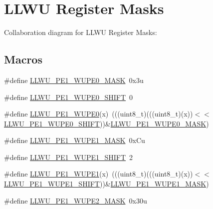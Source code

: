 \hypertarget{group___l_l_w_u___register___masks}{}\section{L\+L\+WU Register Masks}
\label{group___l_l_w_u___register___masks}
Collaboration diagram for L\+L\+WU Register Masks\+:
\subsection*{Macros}
\begin{DoxyCompactItemize}
\item 
\#define \hyperlink{group___l_l_w_u___register___masks_ga6ed6c56a8797caa64d27eb915c164dad}{L\+L\+W\+U\+\_\+\+P\+E1\+\_\+\+W\+U\+P\+E0\+\_\+\+M\+A\+SK}~0x3u
\item 
\#define \hyperlink{group___l_l_w_u___register___masks_ga234c02ee9c2b3e3e248c90473e922336}{L\+L\+W\+U\+\_\+\+P\+E1\+\_\+\+W\+U\+P\+E0\+\_\+\+S\+H\+I\+FT}~0
\item 
\#define \hyperlink{group___l_l_w_u___register___masks_ga61f1d3c27404e82bdebb9627e83f35dd}{L\+L\+W\+U\+\_\+\+P\+E1\+\_\+\+W\+U\+P\+E0}(x)~(((uint8\+\_\+t)(((uint8\+\_\+t)(x))$<$$<$\hyperlink{group___l_l_w_u___register___masks_ga234c02ee9c2b3e3e248c90473e922336}{L\+L\+W\+U\+\_\+\+P\+E1\+\_\+\+W\+U\+P\+E0\+\_\+\+S\+H\+I\+FT}))\&\hyperlink{group___l_l_w_u___register___masks_ga6ed6c56a8797caa64d27eb915c164dad}{L\+L\+W\+U\+\_\+\+P\+E1\+\_\+\+W\+U\+P\+E0\+\_\+\+M\+A\+SK})
\item 
\#define \hyperlink{group___l_l_w_u___register___masks_gac0c417f78992f2ebaca7267ef06d888a}{L\+L\+W\+U\+\_\+\+P\+E1\+\_\+\+W\+U\+P\+E1\+\_\+\+M\+A\+SK}~0x\+Cu
\item 
\#define \hyperlink{group___l_l_w_u___register___masks_gaa9b8224f389f9c3d4f13772d8e5fbeee}{L\+L\+W\+U\+\_\+\+P\+E1\+\_\+\+W\+U\+P\+E1\+\_\+\+S\+H\+I\+FT}~2
\item 
\#define \hyperlink{group___l_l_w_u___register___masks_gab35a751adac37592806af18a4f6e3837}{L\+L\+W\+U\+\_\+\+P\+E1\+\_\+\+W\+U\+P\+E1}(x)~(((uint8\+\_\+t)(((uint8\+\_\+t)(x))$<$$<$\hyperlink{group___l_l_w_u___register___masks_gaa9b8224f389f9c3d4f13772d8e5fbeee}{L\+L\+W\+U\+\_\+\+P\+E1\+\_\+\+W\+U\+P\+E1\+\_\+\+S\+H\+I\+FT}))\&\hyperlink{group___l_l_w_u___register___masks_gac0c417f78992f2ebaca7267ef06d888a}{L\+L\+W\+U\+\_\+\+P\+E1\+\_\+\+W\+U\+P\+E1\+\_\+\+M\+A\+SK})
\item 
\#define \hyperlink{group___l_l_w_u___register___masks_ga97e8e2fc8ce673f6b4625d307bc94b4a}{L\+L\+W\+U\+\_\+\+P\+E1\+\_\+\+W\+U\+P\+E2\+\_\+\+M\+A\+SK}~0x30u

\end{DoxyCompactItemize}
